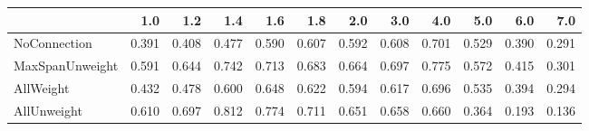 \begin{tabular}{lrrrrrrrrrrr}
\toprule
{} &   1.0 &   1.2 &   1.4 &   1.6 &   1.8 &   2.0 &   3.0 &   4.0 &   5.0 &   6.0 &   7.0 \\
\midrule
NoConnection    & 0.391 & 0.408 & 0.477 & 0.590 & 0.607 & 0.592 & 0.608 & 0.701 & 0.529 & 0.390 & 0.291 \\
MaxSpanUnweight & 0.591 & 0.644 & 0.742 & 0.713 & 0.683 & 0.664 & 0.697 & 0.775 & 0.572 & 0.415 & 0.301 \\
AllWeight       & 0.432 & 0.478 & 0.600 & 0.648 & 0.622 & 0.594 & 0.617 & 0.696 & 0.535 & 0.394 & 0.294 \\
AllUnweight     & 0.610 & 0.697 & 0.812 & 0.774 & 0.711 & 0.651 & 0.658 & 0.660 & 0.364 & 0.193 & 0.136 \\
\bottomrule
\end{tabular}
